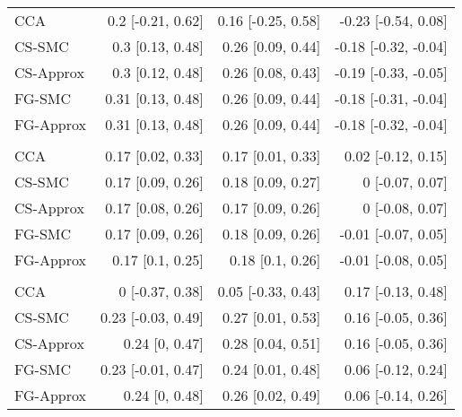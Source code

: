 \documentclass[
  12pt,
  a4paper,
]{article}
\begin{document}
\begin{longtable}[t]{lrrr}
\hspace{1em}CCA & 0.2 [-0.21, 0.62] & 0.16 [-0.25, 0.58] & -0.23 [-0.54, 0.08]\\
\hspace{1em}CS-SMC & 0.3 [0.13, 0.48] & 0.26 [0.09, 0.44] & -0.18 [-0.32, -0.04]\\
\hspace{1em}CS-Approx & 0.3 [0.12, 0.48] & 0.26 [0.08, 0.43] & -0.19 [-0.33, -0.05]\\
\hspace{1em}FG-SMC & 0.31 [0.13, 0.48] & 0.26 [0.09, 0.44] & -0.18 [-0.31, -0.04]\\
\hspace{1em}FG-Approx & 0.31 [0.13, 0.48] & 0.26 [0.09, 0.44] & -0.18 [-0.32, -0.04]\\
\addlinespace[0.3em]
\multicolumn{4}{l}{\textbf{WBC count (log)}}\\
\hspace{1em}CCA & 0.17 [0.02, 0.33] & 0.17 [0.01, 0.33] & 0.02 [-0.12, 0.15]\\
\hspace{1em}CS-SMC & 0.17 [0.09, 0.26] & 0.18 [0.09, 0.27] & 0 [-0.07, 0.07]\\
\hspace{1em}CS-Approx & 0.17 [0.08, 0.26] & 0.17 [0.09, 0.26] & 0 [-0.08, 0.07]\\
\hspace{1em}FG-SMC & 0.17 [0.09, 0.26] & 0.18 [0.09, 0.26] & -0.01 [-0.07, 0.05]\\
\hspace{1em}FG-Approx & 0.17 [0.1, 0.25] & 0.18 [0.1, 0.26] & -0.01 [-0.08, 0.05]\\
\addlinespace[0.3em]
\multicolumn{4}{l}{\textbf{Weight loss: yes}}\\
\hspace{1em}CCA & 0 [-0.37, 0.38] & 0.05 [-0.33, 0.43] & 0.17 [-0.13, 0.48]\\
\hspace{1em}CS-SMC & 0.23 [-0.03, 0.49] & 0.27 [0.01, 0.53] & 0.16 [-0.05, 0.36]\\
\hspace{1em}CS-Approx & 0.24 [0, 0.47] & 0.28 [0.04, 0.51] & 0.16 [-0.05, 0.36]\\
\hspace{1em}FG-SMC & 0.23 [-0.01, 0.47] & 0.24 [0.01, 0.48] & 0.06 [-0.12, 0.24]\\
\hspace{1em}FG-Approx & 0.24 [0, 0.48] & 0.26 [0.02, 0.49] & 0.06 [-0.14, 0.26]\\

\end{longtable}
\end{document}
